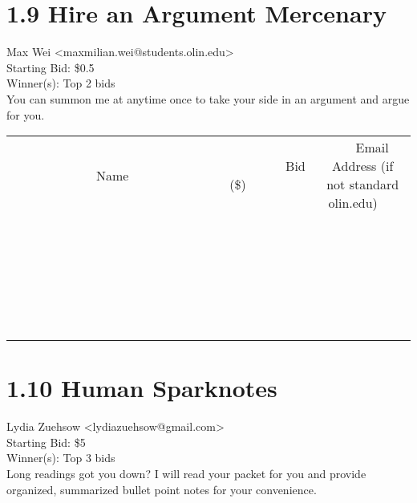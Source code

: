 \documentclass[11pt]{article}
\begin{document}
					\section*{1.9 Hire an Argument Mercenary}
					Max Wei <maxmilian.wei@students.olin.edu> \\
					Starting Bid: \$0.5 \\
					Winner(s): Top 2 bids \\
					You can summon me at anytime once to take your side in an argument and argue for you. \\
					[6ex]
					\begin{tabular}{c c c}
						~~~~~~~~~~~~~Name~~~~~~~~~~~~~ & ~~~~~~~~~Bid (\$)~~~~~~~~~ & ~~~Email Address (if not standard olin.edu)~~~ \\
				
 & & \\
\hline
 & & \\
\hline
 & & \\
\hline
 & & \\
\hline
 & & \\
\hline
 & & \\
\hline
 & & \\
\hline
 & & \\
\hline
 & & \\
\hline
 & & \\
\hline
 & & \\
\hline
 & & \\
\hline
 & & \\
\hline
 & & \\
\hline
 & & \\
\hline
 & & \\
\hline
 & & \\
\hline
 & & \\
\hline
 & & \\
\hline
 & & \\
\hline
 & & \\
\hline
 & & \\
\hline
 & & \\
\hline
 & & \\
\hline
 & & \\
\hline
 & & \\
\hline
					\end{tabular}
					\clearpage
				
					\section*{1.10 Human Sparknotes}
					Lydia Zuehsow <lydiazuehsow@gmail.com> \\
					Starting Bid: \$5 \\
					Winner(s): Top 3 bids \\
					Long readings got you down? I will read your packet for you and provide organized, summarized bullet point notes for your convenience.
\end{document}
